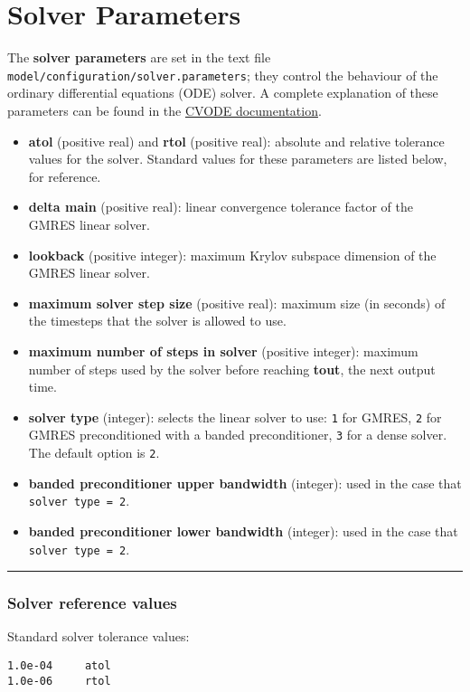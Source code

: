 \chapter{Solver Parameters}

The \textbf{solver parameters} are set in the text file
\texttt{model/configuration/solver.parameters}; they control the
behaviour of the ordinary differential equations (ODE) solver. A
complete explanation of these parameters can be found in the
\href{https://computation.llnl.gov/projects/sundials/sundials-software}{CVODE
documentation}.

\begin{itemize}
\item
  \textbf{atol} (positive real) and \textbf{rtol} (positive real):
  absolute and relative tolerance values for the solver. Standard values
  for these parameters are listed below, for reference.
\item
  \textbf{delta main} (positive real): linear convergence tolerance
  factor of the GMRES linear solver.
\item
  \textbf{lookback} (positive integer): maximum Krylov subspace
  dimension of the GMRES linear solver.
\item
  \textbf{maximum solver step size} (positive real): maximum size (in
  seconds) of the timesteps that the solver is allowed to use.
\item
  \textbf{maximum number of steps in solver} (positive integer): maximum
  number of steps used by the solver before reaching \textbf{tout}, the
  next output time.
\item
  \textbf{solver type} (integer): selects the linear solver to use:
  \texttt{1} for GMRES, \texttt{2} for GMRES preconditioned with a
  banded preconditioner, \texttt{3} for a dense solver. The default
  option is \texttt{2}.
\item
  \textbf{banded preconditioner upper bandwidth} (integer): used in the
  case that \texttt{solver\ type\ =\ 2}.
\item
  \textbf{banded preconditioner lower bandwidth} (integer): used in the
  case that \texttt{solver\ type\ =\ 2}.
\end{itemize}

\begin{center}\rule{0.5\linewidth}{\linethickness}\end{center}

\hypertarget{solver-reference-values}{%
\subsection{Solver reference values}\label{solver-reference-values}}

Standard solver tolerance values:

\begin{verbatim}
1.0e-04     atol
1.0e-06     rtol
\end{verbatim}
